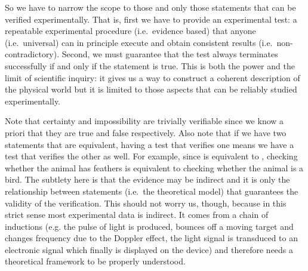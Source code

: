 	So we have to narrow the scope to those and only those statements that can be verified experimentally. That is, first we have to provide an experimental test: a repeatable experimental procedure (i.e.~evidence based) that anyone (i.e.~universal) can in principle execute and obtain consistent results (i.e.~non-contradictory). Second, we must guarantee that the test always terminates successfully if and only if the statement is true. This is both the power and the limit of scientific inquiry: it gives us a way to construct a coherent description of the physical world but it is limited to those aspects that can be reliably studied experimentally.
	
	Note that certainty and impossibility are trivially verifiable since we know a priori that they are true and false respectively. Also note that if we have two statements that are equivalent, having a test that verifies one means we have a test that verifies the other as well. For example, since  is equivalent to , checking whether the animal has feathers is equivalent to checking whether the animal is a bird. The subtlety here is that the evidence may be indirect and it is only the relationship between statements (i.e.~the theoretical model) that guarantees the validity of the verification. This should not worry us, though, because in this strict sense most experimental data is indirect. It comes from a chain of inductions (e.g. the pulse of light is produced, bounces off a moving target and changes frequency due to the Doppler effect, the light signal is transduced to an electronic signal which finally is displayed on the device) and therefore needs a theoretical framework to be properly understood.
	
